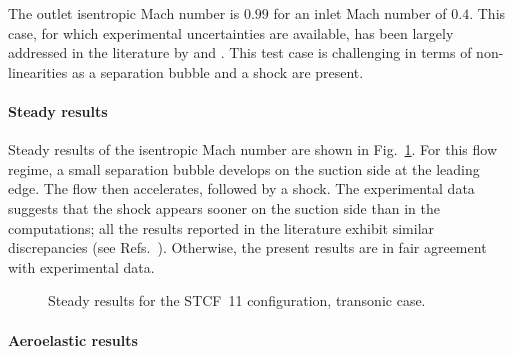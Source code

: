 
The outlet isentropic Mach number is $0.99$ for an inlet Mach number of $0.4$. 
This case, for which experimental uncertainties are available, 
has been largely addressed in the literature by
\citet{Sbardella2001,Duta2002,Campobasso2003,Cinnella2004} and \citet{Huang2013a}. 
This test case is challenging in terms of non-linearities as a separation bubble and a shock are present.

\paragraph{Steady results}

Steady results of the isentropic Mach number are shown in
Fig.~\ref{fig:stcf11_rans_transonic}.  For this flow regime,
a small separation
bubble develops on the suction side at the leading edge.  
The flow then accelerates, followed by a shock.  
The experimental data suggests that the shock appears
sooner on the suction side than in the computations; all the results 
reported in the literature exhibit similar discrepancies (see
Refs.~\cite{Fransson1999,Sbardella2001,Duta2002,Campobasso2003,Cinnella2004,Huang2013a}). 
Otherwise, the present results are in fair agreement with experimental data.
\begin{figure}[htb]
  \centering
  \caption{Steady results for the STCF~11 configuration, transonic case.}
  \label{fig:stcf11_rans_transonic}
\end{figure}

\paragraph{Aeroelastic results}

